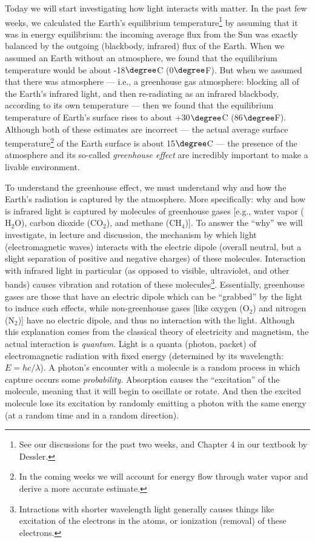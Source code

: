 Today we will start investigating how light interacts with matter.   In the past few weeks, we calculated the Earth's equilibrium temperature\footnote{See our discussions for the past two weeks, and Chapter 4 in our textbook by Dessler.} by assuming that it was in energy equilibrium: the incoming average flux from the Sun was exactly balanced by the outgoing (blackbody, infrared) flux of the Earth.  When we assumed an Earth without an atmosphere, we found that the equilibrium temperature would be about -18$\degree$C (0$\degree$F). But when we assumed that there was atmosphere --- i.e., a greenhouse gas atmosphere: blocking all of the Earth's infrared light, and then re-radiating as an infrared blackbody, according to its own temperature --- then we found that the equilibrium temperature of Earth's surface rises to about +30$\degree$C (86$\degree$F). Although both of these estimates are incorrect --- the actual average surface temperature\footnote{In the coming weeks we will account for energy flow through water vapor and derive a more accurate estimate.} of the Earth surface is about 15$\degree$C --- the presence of the atmosphere and its so-called {\em greenhouse effect} are incredibly important to make a livable environment.

To understand the greenhouse effect, we must understand why and how the Earth's radiation is captured by the atmosphere. More specifically: why and how is infrared light is captured by molecules of greenhouse gases [e.g., water vapor ($\text{H}_2\text{O}$), carbon dioxide ($\text{CO}_2$), and methane ($\text{CH}_4$)].  To answer the ``why'' we will investigate, in lecture and discussion, the mechanism by which light (electromagnetic waves) interacts with the electric dipole (overall neutral, but a slight separation of positive and negative charges) of these molecules.  Interaction with infrared light in particular (as opposed to visible, ultraviolet, and other bands) causes vibration and rotation of these molecules\footnote{Intractions with shorter wavelength light generally causes things like excitation of the electrons in the atoms, or ionization (removal) of these electrons.}. Essentially, greenhouse gases are those that have an electric dipole which can be ``grabbed'' by the light to induce such effects, while non-greenhouse gases [like oxygen ($\text{O}_2$) and nitrogen ($\text{N}_2$)] have no electric dipole, and thus no interaction with the light.  Although this explanation comes from the classical theory of electricity and magnetism, the actual interaction is {\em quantum}.  Light is a quanta (photon, packet) of electromagnetic radiation with fixed energy (determined by its wavelength: $E = h c / \lambda$). A photon's encounter with a molecule is a random process in which capture occurs some {\em probability}.  Absorption causes the ``excitation'' of the molecule, meaning that it will begin to oscillate or rotate. And then the excited molecule lose its excitation by randomly emitting a photon with the same energy (at a random time and in a random direction).\\[-6pt]

